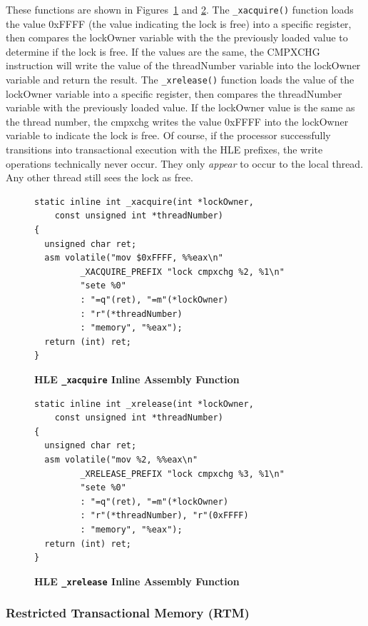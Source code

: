 \documentclass{sig-alternate}
\begin{document}
These functions are shown in Figures~\ref{hle_inline_xacquire} and
\ref{hle_inline_xrelease}.  The \texttt{\_xacquire()} function loads the value 0xFFFF (the
value indicating the lock is free) into a specific register, then compares the lockOwner
variable with the the previously loaded value to determine if the lock is free.  If the
values are the same, the CMPXCHG instruction will write the value of the threadNumber
variable into the lockOwner variable and return the result.  The \texttt{\_xrelease()}
function loads the value of the lockOwner variable into a specific register, then compares
the threadNumber variable with the previously loaded value.  If the lockOwner value is the
same as the thread number, the cmpxchg writes the value 0xFFFF into the lockOwner variable
to indicate the lock is free.  Of course, if the processor successfully transitions into
transactional execution with the HLE prefixes, the write operations technically never
occur.  They only \emph{appear} to occur to the local thread. Any other thread still sees
the lock as free.

\begin{figure}
\begin{verbatim}
static inline int _xacquire(int *lockOwner, 
    const unsigned int *threadNumber)
{
  unsigned char ret;
  asm volatile("mov $0xFFFF, %%eax\n"
         _XACQUIRE_PREFIX "lock cmpxchg %2, %1\n" 
         "sete %0"
         : "=q"(ret), "=m"(*lockOwner)
         : "r"(*threadNumber) 
         : "memory", "%eax");
  return (int) ret;
}
\end{verbatim}
\caption{\textbf{HLE \texttt{\_xacquire} Inline Assembly Function}}\label{hle_inline_xacquire}
\end{figure}

\begin{figure}
\begin{verbatim}
static inline int _xrelease(int *lockOwner, 
    const unsigned int *threadNumber)
{
  unsigned char ret;
  asm volatile("mov %2, %%eax\n"
         _XRELEASE_PREFIX "lock cmpxchg %3, %1\n"
         "sete %0"
         : "=q"(ret), "=m"(*lockOwner)
         : "r"(*threadNumber), "r"(0xFFFF)
         : "memory", "%eax");
  return (int) ret;
}
\end{verbatim}
\caption{\textbf{HLE \texttt{\_xrelease} Inline Assembly Function}}\label{hle_inline_xrelease}
\end{figure}

\subsubsection{Restricted Transactional Memory (RTM)}
\end{document}
